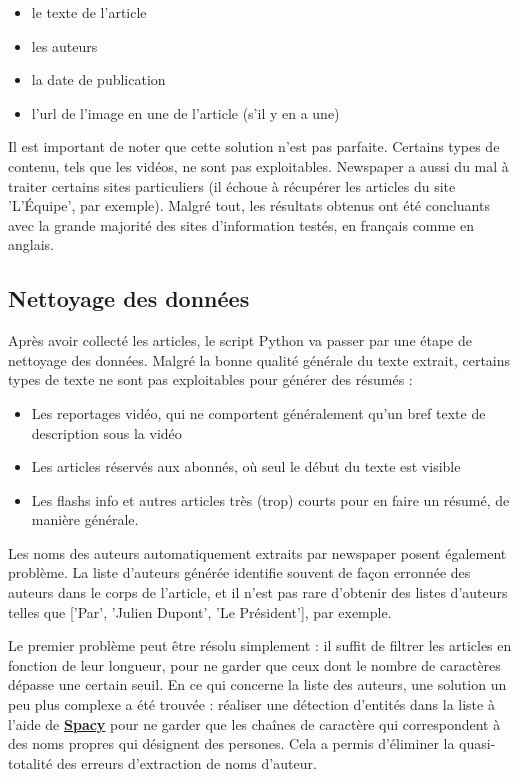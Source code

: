 \documentclass[french]{article}
\begin{document}
    \begin{itemize}
        \item le texte de l'article
        \item les auteurs
        \item la date de publication
        \item l'url de l'image en une de l'article (s'il y en a une)
    \end{itemize}
    Il est important de noter que cette solution n'est pas parfaite. Certains types de contenu, tels que les vidéos, ne sont pas exploitables. Newspaper a aussi du mal à traiter certains sites particuliers (il échoue à récupérer les articles du site 'L'Équipe', par exemple). Malgré tout, les résultats obtenus ont été concluants avec la grande majorité des sites d'information testés, en français comme en anglais.

    \subsection{Nettoyage des données}
    Après avoir collecté les articles, le script Python va passer par une étape de nettoyage des données. Malgré la bonne qualité générale du texte extrait, certains types de texte ne sont pas exploitables pour générer des résumés :
    \begin{itemize}
        \item Les reportages vidéo, qui ne comportent généralement qu'un bref texte de description sous la vidéo
        \item Les articles réservés aux abonnés, où seul le début du texte est visible
        \item Les flashs info et autres articles très (trop) courts pour en faire un résumé, de manière générale.
    \end{itemize}
    Les noms des auteurs automatiquement extraits par newspaper posent également problème. La liste d'auteurs générée identifie souvent de façon erronnée des auteurs dans le corps de l'article, et il n'est pas rare d'obtenir des listes d'auteurs telles que ['Par', 'Julien Dupont', 'Le Président'], par exemple.

    Le premier problème peut être résolu simplement : il suffit de filtrer les articles en fonction de leur longueur, pour ne garder que ceux dont le nombre de caractères dépasse une certain seuil.
    En ce qui concerne la liste des auteurs, une solution un peu plus complexe a été trouvée : réaliser une détection d'entités dans la liste à l'aide de \textbf{\href{https://spacy.io/}{Spacy}} pour ne garder que les chaînes de caractère qui correspondent à des noms propres qui désignent des persones. Cela a permis d'éliminer la quasi-totalité des erreurs d'extraction de noms d'auteur.
    
\end{document}
